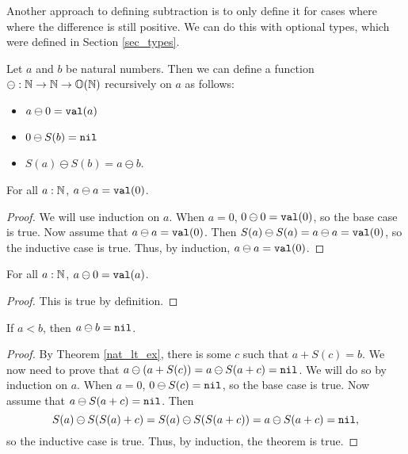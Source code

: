 \documentclass[../../math.tex]{subfiles}
\begin{document}
Another approach to defining subtraction is to only define it for cases where
where the difference is still positive.  We can do this with optional types,
which were defined in Section \ref{sec_types}.

\begin{definition}
    Let $a$ and $b$ be natural numbers.  Then we can define a function $\ominus
    : \mathbb{N} \rightarrow \mathbb{N} \rightarrow \mathbb{O}(\mathbb{N})$ recursively on $a$ as
    follows:
    \begin{itemize}
        \item $a \ominus 0 = \val a$
        \item $0 \ominus S(b) = \nil$
        \item $S(a) \ominus S(b) = a \ominus b$.
    \end{itemize}
\end{definition}

\begin{theorem} \label{nat_minus_eq}
    For all $a : \mathbb{N}$, $a \ominus a = \val 0$.
\end{theorem}
\begin{proof}
    We will use induction on $a$.  When $a = 0$, $0 \ominus 0 = \val 0$,
    so the base case is true.  Now assume that $a \ominus a = \val 0$.  Then
    $S(a) \ominus S(a) = a \ominus a = \val 0$, so the inductive case is true.
    Thus, by induction, $a \ominus a = \val 0$.
\end{proof}

\begin{theorem} \label{nat_minus_zero}
    For all $a : \mathbb{N}$, $a \ominus 0 = \val a$.
\end{theorem}
\begin{proof}
    This is true by definition.
\end{proof}

\begin{theorem} \label{nat_minus_lt}
    If $a < b$, then $a \ominus b = \nil$.
\end{theorem}
\begin{proof}
    By Theorem \ref{nat_lt_ex}, there is some $c$ such that $a + S(c) = b$.  We
    now need to prove that $a \ominus (a + S(c)) = a \ominus S(a + c) = \nil$.
    We will do so by induction on $a$.  When $a = 0$, $0 \ominus S(c) = \nil$,
    so the base case is true.  Now assume that $a \ominus S(a + c) = \nil$.
    Then
    \[
        S(a) \ominus S(S(a) + c) = S(a) \ominus S(S(a + c)) = a \ominus S(a + c)
        = \nil,
    \]
    so the inductive case is true.  Thus, by induction, the theorem is true.
\end{proof}
\end{document}
